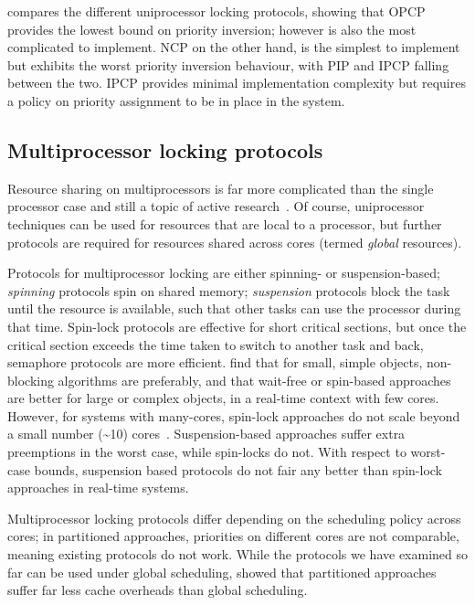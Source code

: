  compares the different uniprocessor locking protocols, showing that \gls{OPCP}
provides the lowest bound on priority inversion; however is also the most complicated to implement.
\gls{NCP} on the other hand, is the simplest to implement but exhibits the worst priority inversion
behaviour, with \gls{PIP} and \gls{IPCP} falling between the two.  \gls{IPCP} provides minimal
implementation complexity but requires a policy on priority assignment to be in place in the system.

\subsection{Multiprocessor locking protocols}

Resource sharing on multiprocessors is far more complicated than the single processor case and still
a topic of active research~\citep{Davis_Burns_11}. Of course, uniprocessor techniques can be used for resources that are
local to a processor, but further protocols are required for resources shared across cores (termed
\emph{global} resources).

Protocols for multiprocessor locking are either spinning- or suspension-based;
\emph{spinning} protocols spin on shared memory; \emph{suspension} protocols block the
task until the resource is available, such that other tasks can use the processor during that time.
Spin-lock protocols are effective for short critical sections, but once the critical section exceeds
the time taken to switch to another task and back, semaphore protocols are more efficient. 
\citet{Brandenburg_CBLA_08} find that for small, simple objects, non-blocking algorithms are
preferably, and that wait-free or spin-based approaches are better for large or complex objects,
in a real-time context with few cores. 
However, for systems with many-cores, spin-lock approaches do not scale beyond a small number
(\textasciitilde10)
cores~\citep{Clements_KZ_13}. 
Suspension-based approaches suffer extra preemptions in the worst case, while spin-locks do not.
With respect to worst-case bounds, suspension based protocols do not fair any better than spin-lock
approaches in real-time systems.

Multiprocessor locking protocols differ depending on the scheduling policy across cores; in
partitioned approaches, priorities on different cores are not comparable, meaning existing protocols
do not work. While the protocols we have examined so far can be used under global scheduling,
\citet{Brandenburg:phd} showed that partitioned approaches suffer far less cache overheads than
global scheduling. 

